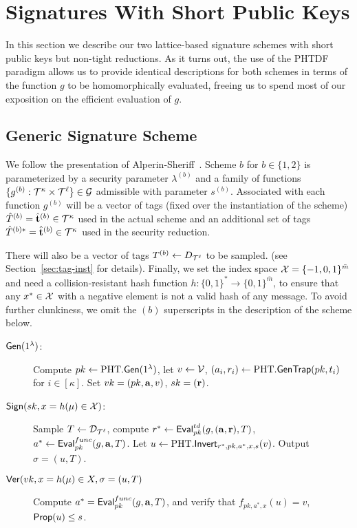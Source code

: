 \section{Signatures With Short Public Keys}
\label{sec:sig-short-pub}
In this section we describe our two
lattice-based signature schemes with short public keys but non-tight
reductions. As it turns out, the use of the PHTDF paradigm allows us
to provide identical descriptions for both schemes in terms of the
function $g$ to be homomorphically evaluated, freeing us to spend most
of our exposition on the efficient evaluation of $g$. 

\subsection{Generic Signature Scheme}
\label{sec:sig-short-constructions}

We follow the presentation of
Alperin-Sheriff~\cite{DBLP:conf/pkc/Alperin-Sheriff15}. Scheme $b$ for
$b \in \{1,2\}$ is parameterized by a security parameter
$\lambda^{(b)}$ and a family of functions
$\{g^{(b)}: \mathcal{T}^{\kappa} \times \mathcal{T}^{\ell}\} \in \mathcal{G}$ admissible
with parameter $s^{(b)}$.  Associated with each function $g^{(b)}$
will be a vector of tags (fixed over the instantiation of the scheme)
$\hat{T}^{(b)} = \hat{\mathbf{t}}^{(b)} \in \mathcal{T}^{\kappa}$ used
in the actual scheme and an additional set of tags
$\hat{T}^{(b)*} = \hat{\mathbf{t}}^{(b)} \in \mathcal{T}^{\kappa}$
used in the security reduction.

There will
also be a vector of tags $T^{(b)} \gets D_{\mathcal{T}^{\ell}}$ to be
sampled. (see
Section~\ref{sec:tag-inst} for details).  Finally, we set the index space $\mathcal{X} =
\{-1,0,1\}^{\bar{m}}$ and need a collision-resistant hash function
$h: \{0,1\}^* \to \{0,1\}^{\bar{m}}$, to ensure that any $x^* \in
\mathcal{X}$ with a negative element is not a valid hash of any message.
To avoid further clunkiness, we omit the $(b)$ superscripts in the description
of the scheme below.

\begin{description}
\item[$\mathsf{Gen}(1^{\lambda})$:] Compute $pk \gets
  \text{PHT}.\mathsf{Gen}(1^{\lambda})$, let $v \gets \mathcal{V}$, $(a_i, r_i)
  \gets \text{PHT}.\mathsf{GenTrap}(pk,t_i)$ for $i \in [\kappa]$. Set $vk =
  (pk,\mathbf{a}, v)$, $sk = (\mathbf{r})$.
\item[$\mathsf{Sign}(sk, x = h(\mu) \in \mathcal{X})$:] Sample $T \gets
  \mathcal{D}_{\mathcal{T}^{\ell}}$, compute $r^* \gets \mathsf{Eval}_{pk}^{td}(g,
  (\mathbf{a},\mathbf{r}),T)$, $a^* \gets \mathsf{Eval}_{pk}^{func}(g,\mathbf{a},T)$.  Let $u \gets
  \text{PHT}.\mathsf{Invert}_{r^*,pk,a^*,x,s}(v)$. Output $\sigma = (u,T)$. 
\item[$\mathsf{Ver}(vk, x= h(\mu) \in X, \sigma = (u,T)$] Compute $a^* =
  \mathsf{Eval}_{pk}^{func}(g,\mathbf{a},T)$, and verify that $f_{pk,a^*,x}(u)=v$,
  $\mathsf{Prop}(u) \leq s$. 
\end{description}

